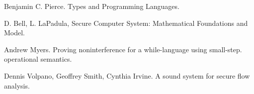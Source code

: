 \documentclass{article}
\begin{document}
\begin{thebibliography}{9}
Benjamin C. Pierce. Types and Programming Languages.

D. Bell, L. LaPadula, Secure Computer System: Mathematical Foundations and Model.

Andrew Myers. Proving noninterference for a while-language using small-step. operational semantics.

Dennis Volpano, Geoffrey Smith, Cynthia Irvine. A sound system for secure flow analysis.
\end{thebibliography}
\end{document}
